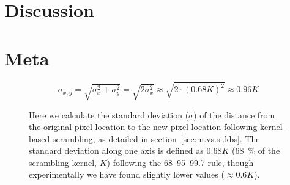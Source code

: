 \chapter{Discussion}
\chapter{Meta}
\begin{figure}
\[ \sigma_{x,y} = \sqrt{\sigma_{x}^{2}+\sigma_{y}^{2}} = \sqrt{2\sigma_{x}^{2}} \approx \sqrt{2 \cdot (0.68 K)^{2}} \approx 0.96K\]
\caption{Here we calculate the standard deviation ($\sigma$) of the distance from the original pixel location to the new pixel location following kernel-based scrambling, as detailed in section~\ref{sec:m.vs.si.kbs}. The standard deviation along one axis is defined as $0.68K$ (\SI{68}{\percent} of the scrambling kernel, $K$) following the 68–95–99.7 rule, though experimentally we have found slightly lower values ($\approx 0.6K$).}\label{eq:lrgn}
\end{figure}

